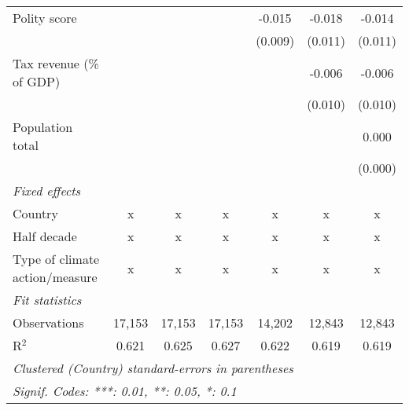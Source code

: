 \begin{tabular}{lcccccc}
   Polity score                                                  &               &                &                & -0.015         & -0.018         & -0.014\\   
                                                                 &               &                &                & (0.009)        & (0.011)        & (0.011)\\   
   Tax revenue (\% of GDP)                                       &               &                &                &                & -0.006         & -0.006\\   
                                                                 &               &                &                &                & (0.010)        & (0.010)\\   
   Population total                                              &               &                &                &                &                & 0.000\\   
                                                                 &               &                &                &                &                & (0.000)\\   
   \emph{Fixed effects}\\
   Country                                                       & x             & x              & x              & x              & x              & x\\  
   Half decade                                                   & x             & x              & x              & x              & x              & x\\  
   Type of climate action/measure                                & x             & x              & x              & x              & x              & x\\  
   \midrule \emph{Fit statistics}\\
   Observations                                                  & 17,153        & 17,153         & 17,153         & 14,202         & 12,843         & 12,843\\  
   R$^2$                                                         & 0.621         & 0.625          & 0.627          & 0.622          & 0.619          & 0.619\\  
   \midrule
   \multicolumn{7}{l}{\emph{Clustered (Country) standard-errors in parentheses}}\\
   \multicolumn{7}{l}{\emph{Signif. Codes: ***: 0.01, **: 0.05, *: 0.1}}\\
\end{tabular}
\par\endgroup



